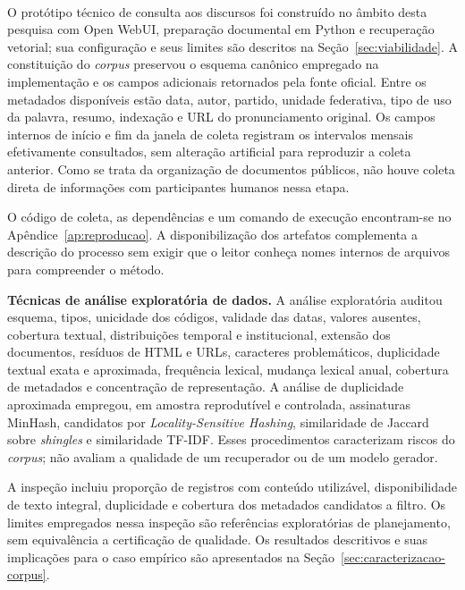~

O protótipo técnico de consulta aos discursos foi construído no âmbito desta pesquisa com Open WebUI, preparação documental em Python e recuperação vetorial; sua configuração e seus limites são descritos na Seção~\ref{sec:viabilidade}. A constituição do \textit{corpus} preservou o esquema canônico empregado na implementação e os campos adicionais retornados pela fonte oficial. Entre os
metadados disponíveis estão data, autor, partido, unidade federativa, tipo de uso da palavra, resumo, indexação e URL do
pronunciamento original. Os campos internos de início e fim da janela de coleta registram os intervalos mensais efetivamente
consultados, sem alteração artificial para reproduzir a coleta anterior. Como se trata da organização de documentos públicos,
não houve coleta direta de informações com participantes humanos nessa etapa.

O código de coleta, as dependências e um comando de execução encontram-se no Apêndice~\ref{ap:reproducao}. A disponibilização dos artefatos complementa a descrição do processo sem exigir que o leitor conheça nomes internos de arquivos para compreender o método.

\noindent\textbf{Técnicas de análise exploratória de dados.} A análise exploratória auditou esquema, tipos, unicidade dos
códigos, validade das datas, valores ausentes, cobertura textual, distribuições temporal e institucional, extensão dos documentos,
resíduos de HTML e URLs, caracteres problemáticos, duplicidade textual exata e aproximada, frequência lexical, mudança lexical
anual, cobertura de metadados e concentração de representação. A análise de duplicidade aproximada empregou, em amostra reprodutível
e controlada, assinaturas MinHash, candidatos por \textit{Locality-Sensitive Hashing}, similaridade de Jaccard sobre
\textit{shingles} e similaridade TF-IDF. Esses procedimentos caracterizam riscos do \textit{corpus}; não avaliam a qualidade de um
recuperador ou de um modelo gerador.

A inspeção incluiu proporção de registros com conteúdo utilizável, disponibilidade de texto integral, duplicidade e cobertura dos metadados candidatos a filtro. Os limites empregados nessa inspeção são referências exploratórias de planejamento, sem equivalência a certificação de qualidade. Os resultados descritivos e suas implicações para o caso empírico são apresentados na Seção~\ref{sec:caracterizacao-corpus}.


